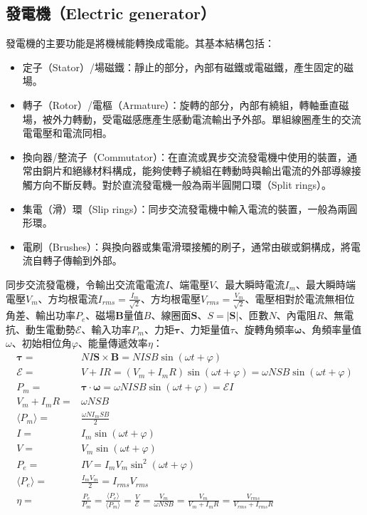 \documentclass[a4paper,12pt]{report}
\begin{document}
\begin{itemize}
\subsection{發電機（Electric generator）}
發電機的主要功能是將機械能轉換成電能。其基本結構包括：
\begin{itemize}
\item 定子（Stator）/場磁鐵：靜止的部分，內部有磁鐵或電磁鐵，產生固定的磁場。
\item 轉子（Rotor）/電樞（Armature）：旋轉的部分，內部有繞組，轉軸垂直磁場，被外力轉動，受電磁感應產生感動電流輸出予外部。單組線圈產生的交流電電壓和電流同相。
\item 換向器/整流子（Commutator）：在直流或異步交流發電機中使用的裝置，通常由銅片和絕緣材料構成，能夠使轉子繞組在轉動時與輸出電流的外部導線接觸方向不斷反轉。對於直流發電機一般為兩半圓開口環（Split rings）。
\item 集電（滑）環（Slip rings）：同步交流發電機中輸入電流的裝置，一般為兩圓形環。
\item 電刷（Brushes）：與換向器或集電滑環接觸的刷子，通常由碳或銅構成，將電流自轉子傳輸到外部。
\end{itemize}
同步交流發電機，令輸出交流電電流$I$、端電壓$V$、最大瞬時電流$I_m$、最大瞬時端電壓$V_m$、方均根電流$I_{rms}=\frac{I_m}{\sqrt{2}}$、方均根電壓$V_{rms}=\frac{V_m}{\sqrt{2}}$、電壓相對於電流無相位角差、輸出功率$P_e$、磁場$\mathbf{B}$量值$B$、線圈面$\mathbf{S}$、$S=|\mathbf{S}|$、匝數$N$、內電阻$R$、無電抗、動生電動勢$\mathcal{E}$、輸入功率$P_m$、力矩$\boldsymbol{\tau}$、力矩量值$\tau$、旋轉角頻率$\boldsymbol{\omega}$、角頻率量值$\omega$、初始相位角$\varphi$、能量傳遞效率$\eta$：
\[\begin{aligned}
\boldsymbol{\tau}=&NI\mathbf{S}\times\mathbf{B}=NISB\sin(\omega t+\varphi)\\
\mathcal{E}=&V+IR=(V_m+I_mR)\sin(\omega t+\varphi)=\omega NSB\sin(\omega t+\varphi)\\
P_m=&\boldsymbol{\tau}\cdot\boldsymbol{\omega}=\omega NISB\sin(\omega t+\varphi)=\mathcal{E}I\\
V_m+I_mR=&\omega NSB\\
\langle P_m\rangle=&\frac{\omega NI_mSB}{2}\\
I=&I_m\sin(\omega t+\varphi)\\
V=&V_m\sin(\omega t+\varphi)\\
P_e=&IV=I_mV_m\sin^2(\omega t+\varphi)\\
\langle P_e\rangle=&\frac{I_mV_m}{2}=I_{rms}V_{rms}\\
\eta=&\frac{P_e}{P_m}=\frac{\langle P_e\rangle}{\langle P_m\rangle}=\frac{V}{\mathcal{E}}=\frac{V_m}{\omega NSB}=\frac{V_m}{V_m+I_mR}=\frac{V_{rms}}{V_{rms}+I_{rms}R}
\end{aligned}\]

\end{itemize}
\end{document}
